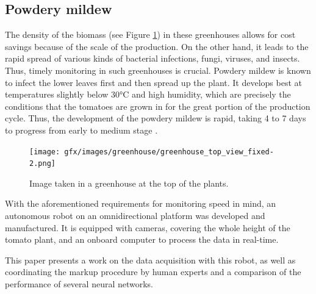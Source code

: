 \begin{description}
\subsection{Powdery mildew}
The density of the biomass (see Figure \ref{fig_greenhouse_top_view}) in these greenhouses allows for cost savings because of the scale of the production. 
On the other hand, it leads to the rapid spread of various kinds of bacterial infections, fungi, viruses, and insects. Thus, timely monitoring in such greenhouses is crucial.
Powdery mildew is known to infect the lower leaves first and then spread up the plant.
It develops best at temperatures slightly below 30\si{\celsius} and high humidity, which are precisely the conditions that the tomatoes are grown in for the great portion of the production cycle.
Thus, the development of the powdery mildew is rapid, taking 4 to 7 days to progress from early to medium stage \cite{WSPANIALY2016487}.

\begin{figure}[!htb]
    \centering
        \texttt{[image: gfx/images/greenhouse/greenhouse\_top\_view\_fixed-2.png]}
        \caption{Image taken in a greenhouse at the top of the plants.}
        \label{fig_greenhouse_top_view}
\end{figure}
With the aforementioned requirements for monitoring speed in mind, an autonomous robot on an omnidirectional platform was developed and manufactured.
It is equipped with cameras, covering the whole height of the tomato plant, and an onboard computer to process the data in real-time.

This paper presents a work on the data acquisition with this robot, as well as coordinating the markup procedure by human experts and a comparison of the performance of several neural networks.

\end{description}
